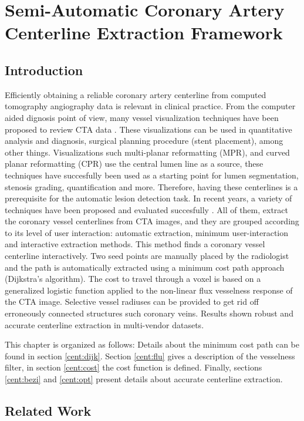 \chapter{Semi-Automatic Coronary Artery Centerline Extraction Framework}
%

\section{Introduction}
%
Efficiently obtaining a reliable coronary artery centerline from computed tomography angiography data is relevant in clinical practice. From the computer aided dignosis point of view, many vessel visualization techniques have been proposed to review CTA data \citep{Cademartiri2007}.  These visualizations can be used in quantitative analysis and diagnosis, surgical planning procedure (stent placement), among other things. Visualizations such multi-planar reformatting (MPR), and curved planar reformatting \citep{Kanitsar2002} (CPR) use the central lumen line as a source, these techniques have succesfully been used as a starting point for lumen segmentation, stenosis grading, quantification and more. Therefore, having these centerlines is a prerequisite for the automatic lesion detection task.
In recent years, a variety of techniques have been proposed and evaluated succesfully \citep{Schaap2009}. All of them, extract the coronary vessel centerlines from CTA images, and they are grouped according to its level of user interaction: automatic extraction, minimum user-interaction and interactive extraction methods.
This method finds a coronary vessel centerline interactively. Two seed points are manually placed by the radiologist and the path is automatically extracted using a minimum cost path approach (Dijkstra’s algorithm). The cost to travel through a voxel is based on a generalized logistic function applied to the non-linear flux vesselness response \citep{Lesage2009a}  of the CTA image. Selective vessel radiuses can be provided to get rid off erroneously connected structures such coronary veins. Results shown robust and accurate centerline extraction in multi-vendor datasets.

This chapter is organized as follows: Details about the minimum cost path can be found in section \ref{cent:dijk}. Section \ref{cent:flu} gives a description of the vesselness filter, in section \ref{cent:cost} the cost function is defined. Finally, sections \ref{cent:bezi} and \ref{cent:opt} present details about accurate centerline extraction.

\section{Related Work}

